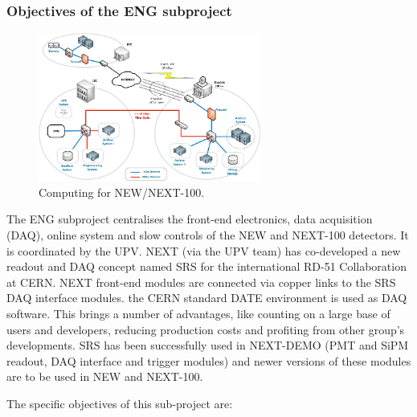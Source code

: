%
%

\subsubsection*{Objectives of the ENG subproject}


\begin{figure}[h!]
\begin{center}
\includegraphics[width=0.65\textwidth]{img/ComputingNext.pdf}
\end{center}
\caption{\label{Fig:Online} Computing for NEW/NEXT-100. }
\end{figure}

The ENG subproject centralises the front-end electronics, data acquisition (DAQ), online system and slow controls of the NEW and NEXT-100 detectors. It is coordinated by the UPV.
NEXT (via the UPV team) has co-developed a new readout and DAQ concept named SRS for the international RD-51 Collaboration at CERN. NEXT front-end modules are connected via copper links to the SRS DAQ interface modules. the CERN standard DATE environment is used as DAQ software. This brings a number of advantages, like counting on a large base of users and developers, reducing production costs and profiting from other group’s developments. SRS has been successfully used in NEXT-DEMO (PMT and SiPM readout, DAQ interface and trigger modules) and newer versions of these modules are to be used in NEW and NEXT-100.

The specific objectives of this sub-project are:

